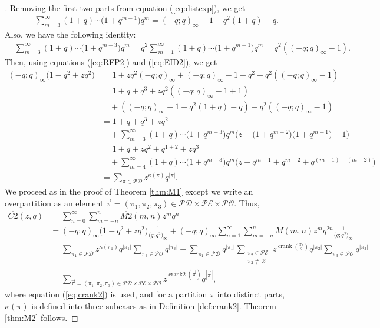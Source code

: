 \documentclass[10pt,a4paper]{amsart}
\numberwithin{equation}{section}
\newcommand\mylabel[1]{\label{#1}}
\newcommand\thm[1]{\ref{thm:#1}}
\newcommand\eqn[1]{(\ref{eq:#1})}
\newcommand\refdef[1]{\ref{def:#1}}
\begin{document}
\begin{proof}[\unskip\nopunct]
Removing the first two parts from equation \eqn{distexp}, we get
\begin{align}
\mylabel{eq:RFP2}
&\sum\limits_{m=3}^{\infty}(1+q)\cdots\bigl(1+q^{m-1}\bigr)q^m=(-q;q)_{\infty}-1-q^2(1+q)-q.
\end{align}
Also, we have the following identity:
\begin{align}
\mylabel{eq:EID2}
&\sum\limits_{m=3}^{\infty}(1+q)\cdots\bigl(1+q^{m-3}\bigr)q^m=q^2\sum\limits_{m=1}^{\infty}(1+q)\cdots\bigl(1+q^{m-1}\bigr)q^{m}=q^2((-q;q)_{\infty}-1).
\end{align}
Then, using equations \eqn{RFP2} and \eqn{EID2}, we get
\begin{align*}
(-q;q)_{\infty}\bigl(1-q^2+zq^2\bigr)\!&{}=1+zq^2(-q;q)_{\infty}+(-q;q)_{\infty}-1-q^2-q^2((-q;q)_{\infty}-1)
\\
&{}=1+q+q^3+zq^2((-q;q)_{\infty}-1+1)
\\
&\quad{}+((-q;q)_{\infty}-1-q^2(1+q)-q)-q^2((-q;q)_{\infty}-1)
\\
&{}=1+q+q^3+zq^2
\\
&\quad{}+\!\sum\limits_{m=3}^{\infty}(1+q)\cdots\bigl(1+q^{m-3}\bigr)q^{m}\bigl(z+\bigl(1+q^{m-2}\bigr)\bigl(1+q^{m-1}\bigr)-1\bigr)
\\
&{}=1+q+zq^2+q^{1+2}+zq^3
\\
&\quad{}+\!\sum\limits_{m=4}^{\infty}(1+q)\cdots\bigl(1+q^{m-3}\bigr)q^{m}\bigl(z+q^{m-1}\!+q^{m-2}\!+q^{(m-1)+(m-2)}\bigr)
\\
&{}=\!\sum\limits_{\pi \in \mathcal{PD}}z^{\kappa(\pi)}q^{|\pi|}.
\end{align*}
We proceed as in the proof of Theorem \thm{M1} except we write an overpartition as an element $\vec{\pi}=(\pi_1,\pi_2,\pi_3) \in \mathcal{PD} \times \mathcal{PE} \times \mathcal{PO}$.
Thus,
\begin{align*}
\overline{C2}(z,q)&{}=\sum_{n=0}^\infty
\sum_{m=-n}^n \overline{M2}(m,n) z^m q^n
\\
&{}=(-q;q)_{\infty}\bigl(1-q^2+zq^2\bigr)\frac{1}{\bigl(q;q^2\bigr)_{\infty}}+(-q;q)_{\infty}\sum_{n=1}^\infty \sum_{m=-n}^n M(m,n) z^m q^{2n}\frac{1}{\bigl(q;q^2\bigr)_{\infty}}
\\
&{}=\sum\limits_{\pi_1 \in \mathcal{PD}}z^{\kappa(\pi_1)}q^{|\pi_1|}\sum\limits_{\pi_3 \in \mathcal{PO}}q^{|\pi_3|}+\sum\limits_{\pi_1 \in \mathcal{PD}}q^{|\pi_1|}\sum\limits_{\substack{\pi_2 \in \mathcal{PE}\\ \pi_2 \neq \varnothing}}z^{\operatorname{crank}(\frac{\pi_2}{2})}q^{|\pi_2|}\sum\limits_{\pi_3 \in \mathcal{PO}}q^{|\pi_3|}
\\
&{}=\sum\limits_{\vec{\pi} = (\pi_1,\pi_2,\pi_3) \in \mathcal{PD} \times \mathcal{PE} \times \mathcal{PO}}z^{\operatorname{crank2}(\vec{\pi})}q^{|\vec{\pi}|},
\end{align*}
where equation \eqn{crank2} is used, and for a partition $\pi$ into distinct parts, $\kappa(\pi)$ is defined into three subcases as in Definition \refdef{crank2}. Theorem \thm{M2} follows.
\end{proof}
\end{document}
